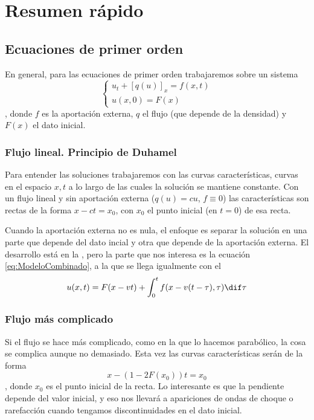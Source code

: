 \chapter{Resumen rápido}

\section{Ecuaciones de primer orden}

En general, para las ecuaciones de primer orden trabajaremos sobre un sistema \[ \begin{cases}
u_t + [q(u)]_x = f(x,t) \\
u(x,0) = F(x)
\end{cases}\], donde $f$ es la aportación externa, $q$ el flujo (que depende de la densidad) y $F(x)$ el dato inicial.

\subsection{Flujo lineal. Principio de Duhamel}

Para entender las soluciones trabajaremos con las curvas características, curvas en el espacio $x,t$ a lo largo de las cuales la solución se mantiene constante. Con un flujo lineal y sin aportación externa ($q(u) = cu$, $f \equiv 0$) las características son rectas de la forma $x - ct = x_0$, con $x_0$ el punto inicial (en $t = 0$) de esa recta.

Cuando la aportación externa no es nula, el enfoque es separar la solución en una parte que depende del dato incial y otra que depende de la aportación externa. El desarrollo está en la , pero la parte que nos interesa es la ecuación \eqref{eq:ModeloCombinado}, a la que se llega igualmente con el  \[ u(x,t) = F(x-vt)+ \int^{t}_{0} f(x-v(t-\tau),\tau) \dif \tau \]

\subsection{Flujo más complicado}

Si el flujo se hace más complicado, como en la  que lo hacemos parabólico, la cosa se complica aunque no demasiado. Esta vez las curvas características serán de la forma \[ x - (1 - 2F(x_0)) t = x_0 \], donde $x_0$ es el punto inicial de la recta. Lo interesante es que la pendiente depende del valor inicial, y eso nos llevará a apariciones de ondas de choque o rarefacción cuando tengamos discontinuidades en el dato inicial.

